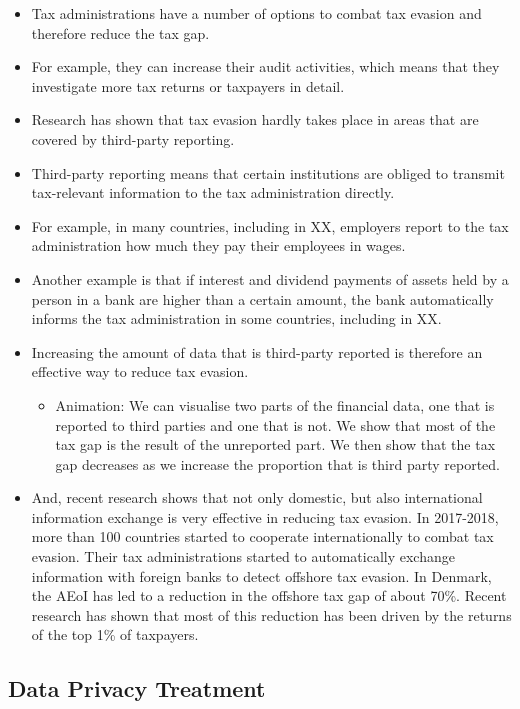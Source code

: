 \documentclass[11pt]{article}
\begin{document}
\begin{itemize}
\begin{itemize}
\end{itemize}
\item Tax administrations have a number of options to combat tax evasion and therefore reduce the tax gap.
\item For example, they can increase their audit activities, which means that they investigate more tax returns or taxpayers in detail.  
\item Research has shown that tax evasion hardly takes place in areas that are covered by third-party reporting.
\item Third-party reporting means that certain institutions are obliged to transmit tax-relevant information to the tax administration directly.
\item For example, in many countries, including in XX, employers report to the tax administration how much they pay their employees in wages.
\item Another example is that if interest and dividend payments of assets held by a person in a bank are higher than a certain amount, the bank automatically informs the tax administration in some countries, including in XX.
\item Increasing the amount of data that is third-party reported is therefore an effective way to reduce tax evasion.
\begin{itemize}
    \item Animation: We can visualise two parts of the financial data, one that is reported to third parties and one that is not. We show that most of the tax gap is the result of the unreported part. We then show that the tax gap decreases as we increase the proportion that is third party reported.
\end{itemize}
\item And, recent research shows that not only domestic, but also international information exchange is very effective in reducing tax evasion. In 2017-2018, more than 100 countries started to cooperate internationally to combat tax evasion. Their tax administrations started to automatically exchange information with foreign banks to detect offshore tax evasion. In Denmark, the AEoI has led to a reduction in the offshore tax gap of about 70\%. Recent research has shown that most of this reduction has been driven by the returns of the top 1\% of taxpayers.
\end{itemize}
\subsection{Data Privacy Treatment}
\end{document}
